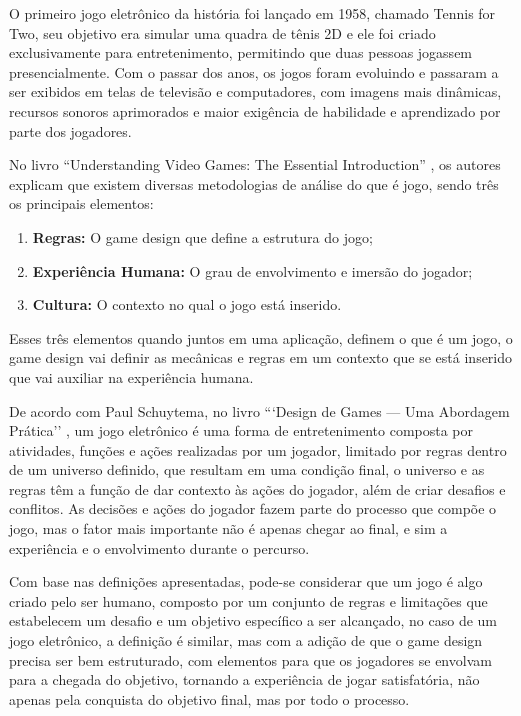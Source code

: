 O primeiro jogo eletrônico da história foi lançado em 1958,
chamado Tennis for Two, seu objetivo era simular uma quadra
de tênis 2D e ele foi criado exclusivamente para entretenimento,
permitindo que duas pessoas jogassem presencialmente. Com o
passar dos anos, os jogos foram evoluindo e passaram a ser exibidos
em telas de televisão e computadores, com imagens mais dinâmicas, 
recursos sonoros aprimorados e maior exigência de habilidade e 
aprendizado por parte dos jogadores.

No livro ``Understanding Video Games: The Essential Introduction''
\cite{egenfeldt2020understanding}, os autores explicam que existem
diversas metodologias de análise do que é jogo, sendo três os principais
elementos:

\begin{enumerate}
	\item \textbf{Regras:} O game design que define a estrutura do jogo;
	\item \textbf{Experiência Humana:} O grau de envolvimento e imersão do jogador;
	\item \textbf{Cultura:}  O contexto no qual o jogo está inserido.
\end{enumerate}

Esses três elementos quando juntos em uma aplicação, definem o que é um jogo,
 o game design vai definir as mecânicas e regras em um contexto que se 
 está inserido que vai auxiliar na experiência humana. 

De acordo com Paul Schuytema, no livro ```Design de Games — Uma Abordagem
Prática'' \cite{schuytema2008design}, um jogo eletrônico é uma forma de 
entretenimento composta por atividades, funções e ações realizadas por 
um jogador, limitado por regras dentro de um universo definido, que resultam 
em uma condição final, o universo e as regras têm a função de dar contexto às 
ações do jogador, além de criar desafios e conflitos.
As decisões e ações do jogador fazem parte do processo que compõe o jogo, 
mas o fator mais importante não é apenas chegar ao final, e sim a experiência
e o envolvimento durante o percurso.

Com base nas definições apresentadas, pode-se considerar que um jogo é
algo criado pelo ser humano, composto por um conjunto de regras e
limitações que estabelecem um desafio e um objetivo específico a ser 
alcançado, no caso de um jogo eletrônico, a definição é similar, mas com a adição 
de que o game design precisa ser bem estruturado, com elementos para 
que os jogadores se envolvam para a chegada do objetivo, 
tornando a experiência de jogar satisfatória, não apenas pela 
conquista do objetivo final, mas por todo o processo.


